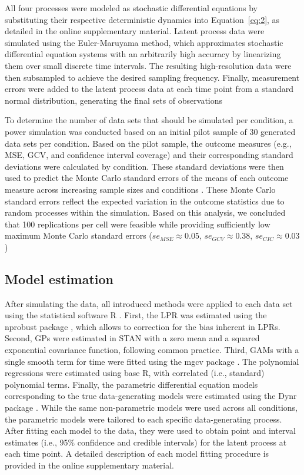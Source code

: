 \documentclass[man, floatsintext]{apa7}
\begin{document}
All four processes were modeled as stochastic differential equations by
substituting their respective deterministic dynamics into Equation~\ref{eq:2},
as detailed in the online supplementary material. Latent process data were
simulated using the Euler-Maruyama method, which approximates stochastic
differential equation systems with an arbitrarily high accuracy by linearizing
them over small discrete time intervals. The resulting high-resolution data
were then subsampled to achieve the desired sampling frequency. Finally,
measurement errors were added to the latent process data at each time point
from a standard normal distribution, generating the final sets of observations

To determine the number of data sets that should be simulated per condition, a
power simulation was conducted based on an initial pilot sample of 30 generated
data sets per condition. Based on the pilot sample, the outcome measures (e.g.,
MSE, GCV, and confidence interval coverage) and their corresponding
standard deviations were calculated by condition. These standard deviations
were then used to predict the Monte Carlo standard errors of the means of each
outcome measure across increasing sample sizes and conditions
\parencite{siepe_simulation_2023}. These Monte Carlo standard errors reflect
the expected variation in the outcome statistics due to random processes within
the simulation. Based on this analysis, we concluded that 100 replications per
cell were feasible while providing sufficiently low maximum Monte Carlo
standard errors ($se_{MSE} \approx 0.05$, $se_{GCV} \approx 0.38$, $se_{CIC}
  \approx 0.03$)

\subsection{Model estimation}

After simulating the data, all introduced methods were applied to each data set
using the statistical software R \parencite{R-base}. First, the LPR was
estimated using the nprobust package \parencite{R-nprobust}, which allows to
correction for the bias inherent in LPRs. Second, GPs were estimated in STAN
\parencite{R-cmdstanr} with a zero mean and a squared exponential covariance
function, following common practice. Third, GAMs with a single smooth term for
time were fitted using the mgcv package \parencite{R-mgcv_a}. The polynomial
regressions were estimated using base R, with correlated (i.e.,
standard) polynomial terms. Finally, the
parametric differential equation models corresponding to the true
data-generating models were estimated using the Dynr package
\parencite{R-dynr}. While the same non-parametric models were used across all
conditions, the parametric models were tailored to each specific
data-generating process. After fitting each model to the data, they were used
to obtain point and interval estimates (i.e., 95\% confidence and credible
intervals) for the latent process at each time point. A detailed description of
each model fitting procedure is provided in the online supplementary material.
\end{document}
